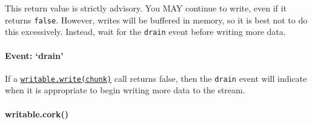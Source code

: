 This return value is strictly advisory. You MAY continue to write, even
if it returns \texttt{false}. However, writes will be buffered in
memory, so it is best not to do this excessively. Instead, wait for the
\texttt{drain} event before writing more data.

\paragraph{Event: `drain'}\label{event-drain}

If a
\hyperref[streamux5fwritableux5fwriteux5fchunkux5fencodingux5fcallback]{\texttt{writable.write(chunk)}}
call returns false, then the \texttt{drain} event will indicate when it
is appropriate to begin writing more data to the stream.

\begin{Shaded}
\begin{Highlighting}[]
 
   \NormalTok{;}
  \NormalTok{();}
   \NormalTok{() \{}
     \NormalTok{;}
     \NormalTok{\{}
      \NormalTok{;}
       \NormalTok{) \{}
      \NormalTok{\} } \NormalTok{\{}
      \NormalTok{\}}
    \NormalTok{\} }  
     \NormalTok{) \{}
      \NormalTok{(}
    \NormalTok{\}}
  \NormalTok{\}}
\NormalTok{\}}
\end{Highlighting}
\end{Shaded}

\paragraph{writable.cork()}\label{writable.cork}

